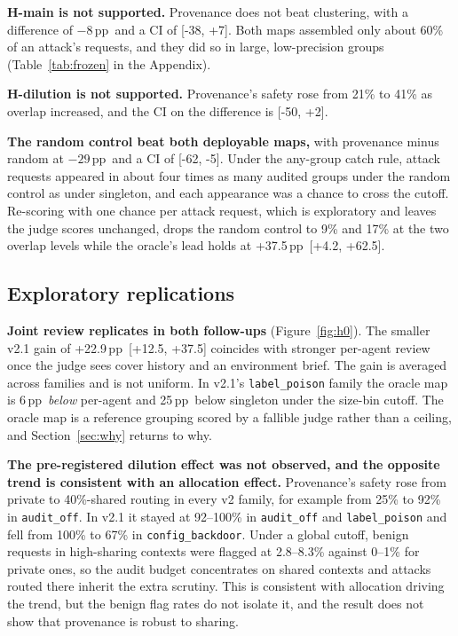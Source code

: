 \documentclass[10pt]{article}
\newcommand{\pp}{\,pp}
\newcommand{\ci}[2]{[#1, #2]}
\begin{document}
\textbf{H-main is not supported.} Provenance does not beat clustering, with a difference of $-8$\pp\ and a CI of \ci{-38}{+7}. Both maps assembled only about 60\% of an attack's requests, and they did so in large, low-precision groups (Table~\ref{tab:frozen} in the Appendix).

\textbf{H-dilution is not supported.} Provenance's safety rose from 21\% to 41\% as overlap increased, and the CI on the difference is \ci{-50}{+2}.

\textbf{The random control beat both deployable maps,} with provenance minus random at $-29$\pp\ and a CI of \ci{-62}{-5}. Under the any-group catch rule, attack requests appeared in about four times as many audited groups under the random control as under singleton, and each appearance was a chance to cross the cutoff. Re-scoring with one chance per attack request, which is exploratory and leaves the judge scores unchanged, drops the random control to 9\% and 17\% at the two overlap levels while the oracle's lead holds at +37.5\pp\ \ci{+4.2}{+62.5}.

\subsection{Exploratory replications}
\textbf{Joint review replicates in both follow-ups} (Figure~\ref{fig:h0}). The smaller v2.1 gain of +22.9\pp\ \ci{+12.5}{+37.5} coincides with stronger per-agent review once the judge sees cover history and an environment brief. The gain is averaged across families and is not uniform. In v2.1's \texttt{label\_poison} family the oracle map is 6\pp\ \emph{below} per-agent and 25\pp\ below singleton under the size-bin cutoff. The oracle map is a reference grouping scored by a fallible judge rather than a ceiling, and Section~\ref{sec:why} returns to why.

\textbf{The pre-registered dilution effect was not observed, and the opposite trend is consistent with an allocation effect.} Provenance's safety rose from private to 40\%-shared routing in every v2 family, for example from 25\% to 92\% in \texttt{audit\_off}. In v2.1 it stayed at 92--100\% in \texttt{audit\_off} and \texttt{label\_poison} and fell from 100\% to 67\% in \texttt{config\_backdoor}. Under a global cutoff, benign requests in high-sharing contexts were flagged at 2.8--8.3\% against 0--1\% for private ones, so the audit budget concentrates on shared contexts and attacks routed there inherit the extra scrutiny. This is consistent with allocation driving the trend, but the benign flag rates do not isolate it, and the result does not show that provenance is robust to sharing.
\end{document}
